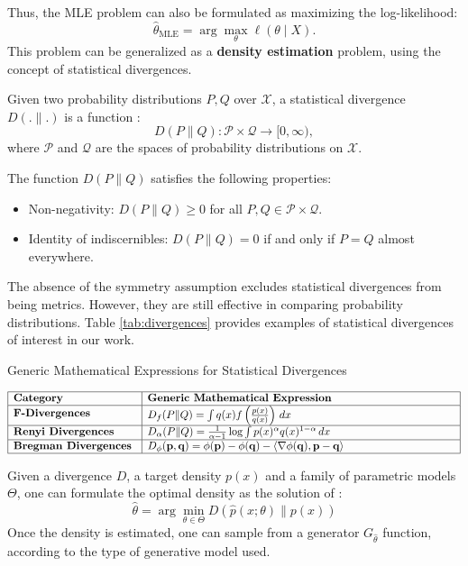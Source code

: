 Thus, the MLE problem can also be formulated as maximizing the log-likelihood:
\begin{equation}
\hat{\theta}_{\text{MLE}} = \arg\max_{\theta} \ell(\theta \mid X).
\end{equation}
This problem can be generalized as a \textbf{density estimation} problem, using the concept of statistical divergences.
\begin{definition}\label{def:divergence}
    Given two probability distributions $P,Q$ over $\mathcal{X}$, a statistical divergence $D(.\|.)$ is a function :
    \begin{equation}
D(P \| Q) : \mathcal{P} \times \mathcal{Q} \rightarrow [0, \infty),
\end{equation}
where $\mathcal{P}$ and $\mathcal{Q}$ are the spaces of probability distributions on $\mathcal{X}$.

The function $D(P \| Q)$ satisfies the following properties:
\begin{itemize}
  \item Non-negativity: $D(P \| Q) \geq 0$ for all $P, Q \in \mathcal{P} \times \mathcal{Q}$.
  \item Identity of indiscernibles: $D(P \| Q) = 0$ if and only if $P = Q$ almost everywhere.
\end{itemize}
\end{definition}
The absence of the symmetry assumption excludes statistical divergences from being metrics. However, they are still effective in comparing probability distributions. Table \ref{tab:divergences} provides examples of statistical divergences of interest in our work.
\begin{table}[ht]
\centering
\caption{Generic Mathematical Expressions for Statistical Divergences}
\[
\begin{array}{|>{\bfseries}m{4cm}|m{10cm}|}\label{tab:divergences}
\hline
\textbf{Category} & \textbf{Generic Mathematical Expression} \\
\hline
\textbf{F-Divergences} & $D_f(P \| Q) = \int q(x) f\left(\frac{p(x)}{q(x)}\right) \, dx$ \\
\hline
\textbf{Renyi Divergences} & $D_{\alpha}(P \| Q) = \frac{1}{\alpha - 1} \log \int p(x)^\alpha q(x)^{1-\alpha} \, dx$ \\
\hline
\textbf{Bregman Divergences} & $D_\phi(\mathbf{p}, \mathbf{q}) = \phi(\mathbf{p}) - \phi(\mathbf{q}) - \langle \nabla \phi(\mathbf{q}), \mathbf{p} - \mathbf{q} \rangle$ \\
\hline
\end{array}
\]
\end{table}
Given a divergence $D$, a target density $p(x)$ and a family of parametric models $\Theta$, one can formulate the optimal density as the solution of :
\begin{equation}\label{eq:density_est}
    \hat{\theta} = \arg\min_{\theta \in \Theta} D(\hat{p}(x; \theta) \| p(x))
\end{equation}
Once the density is estimated, one can sample from a generator $G_{\hat{\theta}}$ function, according to the type of generative model used.
